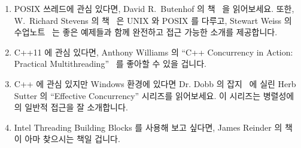 \begin{enumerate}
\iffalse
\item	If your primary focus is scientific and technical computing,
	and you are interested in GPUs, CUDA, and MPI, you
	might check out Norm Matloff's ``Programming on
	Parallel Machines''~\cite{NormMatloff2013ParProcBook}.
\fi

\item	POSIX 쓰레드에 관심 있다면, David R.~Butenhof 의
	책~\cite{Butenhof1997pthreads} 을 읽어보세요.  또한, W.~Richard Stevens
	의 책~\cite{WRichardStevens1992} 은 UNIX 와 POSIX 를 다루고, Stewart
	Weiss 의 수업노트~\cite{StewartWeiss2013UNIX} 는 좋은 예제들과 함께
	완전하고 접근 가능한 소개를 제공합니다.

\iffalse
\item	If you are interested in POSIX Threads, you might take
	a look at David R.~Butenhof's book~\cite{Butenhof1997pthreads}.
	In addition,
	W.~Richard Stevens's book~\cite{WRichardStevens1992}
	covers UNIX and POSIX, and Stewart Weiss's lecture
	notes~\cite{StewartWeiss2013UNIX} provide an
	thorough and accessible introduction with a good set of
	examples.
\fi

\item	C++11 에 관심 있다면, Anthony Williams 의 ``C++ Concurrency in Action:
	Practical Multithreading''~\cite{AnthonyWilliams2012} 를 좋아할 수 있을
	겁니다.

\iffalse
\item	If you are interested in C++11, you might like
	Anthony Williams's ``C++ Concurrency in Action: Practical
	Multithreading''~\cite{AnthonyWilliams2012}.
\fi

\item	C++ 에 관심 있지만 Windows 환경에 있다면 Dr. Dobb 의
	잡지~\cite{HerbSutter2008EffectiveConcurrency} 에 실린 Herb Sutter 의
	``Effective Concurrency'' 시리즈를 읽어보세요.
	이 시리즈는 병렬성에의 일반적 접근을 잘 소개합니다.

\iffalse
\item	If you are interested in C++, but in a Windows environment,
	you might try Herb Sutter's ``Effective Concurrency''
	series in
	Dr. Dobbs Journal~\cite{HerbSutter2008EffectiveConcurrency}.
	This series does a reasonable job of presenting a
	commonsense approach to parallelism.
\fi

\item	Intel Threading Building Blocks 를 사용해 보고 싶다면, James Reinder 의
	책~\cite{Reinders2007Textbook} 이 아마 찾으시는 책일 겁니다.

\iffalse
\item	If you want to try out Intel Threading Building Blocks,
	then perhaps James Reinders's book~\cite{Reinders2007Textbook}
	is what you are looking for.
\fi


\end{enumerate}

